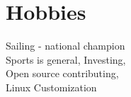 \documentclass[]{deedy-resume-openfont}
\begin{document}
\begin{minipage}[t]{0.66\textwidth}

%
%


\section{Hobbies} 

Sailing - national champion \\ 
Sports is general, Investing, \\
Open source contributing, \\
Linux Customization \\

\sectionspace %


\end{minipage} %








\end{document}
